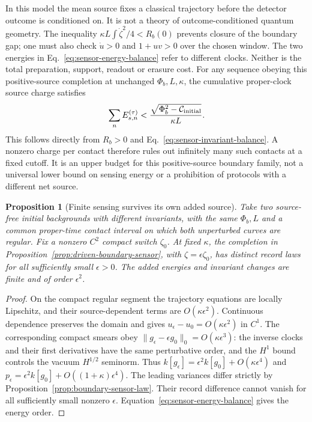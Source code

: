 \documentclass[12pt,a4paper]{article}
\newtheorem{proposition}[theorem]{Proposition}
\begin{document}
In this model the mean source fixes a classical trajectory before the detector
outcome is conditioned on. It is not a theory of outcome-conditioned quantum
geometry. The inequality
$\kappa L\int\dot\zeta^2/4<R_b(0)$ prevents closure of the boundary gap;
one must also check $\dot u>0$ and $1+uv>0$ over the chosen window.
The two energies in Eq.~\eqref{eq:sensor-energy-balance} refer to different
clocks. Neither is the total preparation, support, readout or erasure cost.
For any sequence obeying this positive-source completion at unchanged
$\Phi_b,L,\kappa$, the cumulative proper-clock source charge satisfies
\begin{equation}\label{eq:sensor-cumulative-budget}
 \sum_n E_{s,n}^{(\tau)}
 <\frac{\sqrt{\Phi_b^2-\mathcal C_{\rm initial}}}{\kappa L}.
\end{equation}
This follows directly from $R_b>0$ and
Eq.~\eqref{eq:sensor-invariant-balance}. A nonzero charge per contact therefore
rules out infinitely many such contacts at a fixed cutoff. It is an upper
budget for this positive-source boundary family, not a universal lower bound
on sensing energy or a prohibition of protocols with a different net source.

\begin{proposition}[Finite sensing survives its own added source]
\label{prop:weak-boundary-sensor}
Take two source-free initial backgrounds with different invariants, with the
same $\Phi_b,L$ and a common proper-time contact interval on which both
unperturbed curves are regular. Fix a nonzero $C^2$ compact switch $\zeta_0$.
At fixed $\kappa$, the completion in
Proposition~\ref{prop:driven-boundary-sensor}, with
$\zeta=\epsilon\zeta_0$, has distinct record laws for all sufficiently small
$\epsilon>0$. The added energies and invariant changes are finite and of
order $\epsilon^2$.
\end{proposition}
\begin{proof}
On the compact regular segment the trajectory equations are locally Lipschitz,
and their source-dependent terms are $O(\kappa\epsilon^2)$. Continuous
dependence preserves the domain and gives
$u_\epsilon-u_0=O(\kappa\epsilon^2)$ in $C^1$. The corresponding compact
smears obey
$\|g_\epsilon-\epsilon g_0\|_0=O(\kappa\epsilon^3)$:
the inverse clocks and their first derivatives have the same perturbative
order, and the $H^1$ bound controls the vacuum $H^{1/2}$ seminorm.
Thus $k[g_\epsilon]=\epsilon^2 k[g_0]+O(\kappa\epsilon^4)$ and
$p_\epsilon=\epsilon^2 k[g_0]+O((1+\kappa)\epsilon^4)$.
The leading variances differ strictly by
Proposition~\ref{prop:boundary-sensor-law}. Their record difference cannot
vanish for all sufficiently small nonzero $\epsilon$.
Equation~\eqref{eq:sensor-energy-balance} gives the energy order.
\end{proof}
\end{document}
